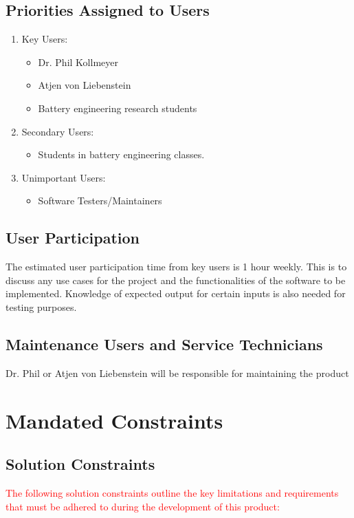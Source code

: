 \documentclass[12pt]{article}
\begin{document}
\subsection{Priorities Assigned to Users}
\begin{enumerate}
    \item Key Users:
    \begin{itemize}
        \item Dr. Phil Kollmeyer
        \item Atjen von Liebenstein
        \item Battery engineering research students
    \end{itemize}
    \item Secondary Users:
    \begin{itemize}
        \item Students in battery engineering classes.
    \end{itemize}
    \item Unimportant Users:
    \begin{itemize}
        \item Software Testers/Maintainers
    \end{itemize}
\end{enumerate}

\subsection{User Participation}
The estimated user participation time from key users is 1 hour weekly. This is to discuss any use cases for the project and the functionalities of the software to be implemented. Knowledge of expected output for certain inputs is also needed for testing purposes.
\subsection{Maintenance Users and Service Technicians}
Dr. Phil or Atjen von Liebenstein will be responsible for maintaining the product

\section{Mandated Constraints}
\subsection{Solution Constraints}
\textcolor{red}{The following solution constraints outline the key limitations and requirements that must be adhered to during the development of this product:}
\end{document}
